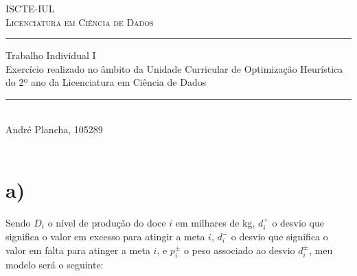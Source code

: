 \begin{titlepage}
  \normalfont\centering

  \normalsize
  \textsc{ISCTE-IUL}\\[-2pt]
  \textsc{Licenciatura em Ciência de Dados}\\
  \vspace{0.5cm}

  \Huge
  \rule[0.3cm]{\linewidth}{0.5pt}
  Trabalho Individual I \\
  \vspace{0.5cm}
  \large
  Exercício realizado no âmbito da Unidade Curricular de Optimização Heurística do 2º ano da Licenciatura em Ciência de Dados
  \rule[-0.5cm]{\linewidth}{1pt}\\

  \vspace{1.2cm}
  {\LARGE 
    André Plancha, 105289 \\
     \\
  }
  \normalsize
  \vspace{3cm}
  {
    \let\clearpage\relax
    \tableofcontents
  }


\end{titlepage}

\renewcommand{\d}[2]{d_{#1}^{#2}}
\newcommand{\p}[2]{p_{#1}^{#2}}

\section{a)}
Sendo $D_i$ o nível de produção do doce $i$ em milhares de \unit{\kilogram}, $d_i^+$ o desvio que significa o valor em excesso para atingir a meta $i$, $d_i^-$ o desvio que significa o valor em falta para atinger a meta $i$, e $p_i^\pm$ o peso associado ao desvio $d_i^\pm$, meu modelo será o seguinte:

